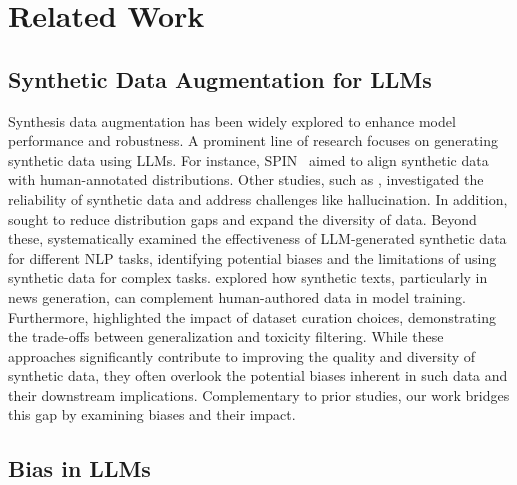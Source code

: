 \section{Related Work}
\label{sec:related}

\subsection{Synthetic Data Augmentation for LLMs}
Synthesis data augmentation has been widely explored to enhance model performance and robustness. A prominent line of research focuses on generating synthetic data using LLMs. For instance, SPIN~\citep{chenself} aimed to align synthetic data with human-annotated distributions. Other studies, such as \citet{rogulsky2024effects}, investigated the reliability of synthetic data and address challenges like hallucination. In addition, \citet{zhu2024synthesize, yu2024large, li2024culturepark, shaib-etal-2024-detection} sought to reduce distribution gaps and expand the diversity of data. Beyond these, \citet{maheshwari2024efficacy} systematically examined the effectiveness of LLM-generated synthetic data for different NLP tasks, identifying potential biases and the limitations of using synthetic data for complex tasks. \citet{Munoz-Ortiz2024} explored how synthetic texts, particularly in news generation, can complement human-authored data in model training. Furthermore, \citet{longpre-etal-2024-pretrainers} highlighted the impact of dataset curation choices, demonstrating the trade-offs between generalization and toxicity filtering. While these approaches significantly contribute to improving the quality and diversity of synthetic data, they often overlook the potential biases inherent in such data and their downstream implications. 
Complementary to prior studies, our work bridges this gap by examining biases and their impact.


\subsection{Bias in LLMs}

